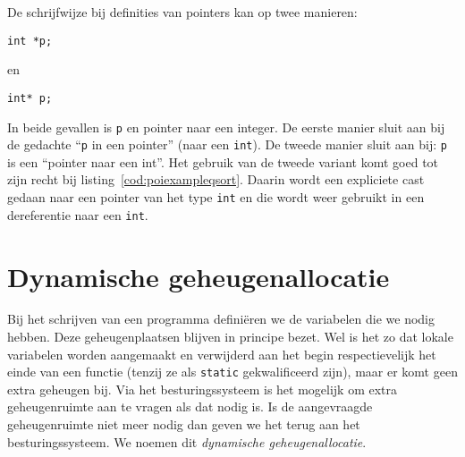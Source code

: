 %
%
%
%
%
%
%
%


\begin{infobox}
De schrijfwijze bij definities van pointers kan op twee manieren:

\hspace*{1em}\texttt{int *p;}

en

\hspace*{1em}\texttt{int* p;}

In beide gevallen is \texttt{p} en pointer naar een integer. De eerste manier sluit aan bij de gedachte ``\texttt{p} in een pointer'' (naar een \texttt{int}). De tweede manier sluit aan bij: \texttt{p} is een ``pointer naar een int''. Het gebruik van de tweede variant komt goed tot zijn recht bij listing~\ref{cod:poiexampleqsort}. Daarin wordt een expliciete cast gedaan naar een pointer van het type \texttt{int} en die wordt weer gebruikt in een dereferentie naar een \texttt{int}.
\end{infobox}


\section{Dynamische geheugenallocatie}
Bij het schrijven van een programma definiëren we de variabelen die we nodig hebben. Deze geheugenplaatsen blijven in principe bezet. Wel is het zo dat lokale variabelen worden aangemaakt en verwijderd aan het begin respectievelijk het einde van een functie (tenzij ze als \texttt{static} gekwalificeerd zijn), maar er komt geen extra geheugen bij. Via het besturingssysteem is het mogelijk om extra geheugenruimte aan te vragen als dat nodig is. Is de aangevraagde geheugenruimte niet meer nodig dan geven we het terug aan het besturingssysteem. We noemen dit \textsl{dynamische geheugenallocatie}.

